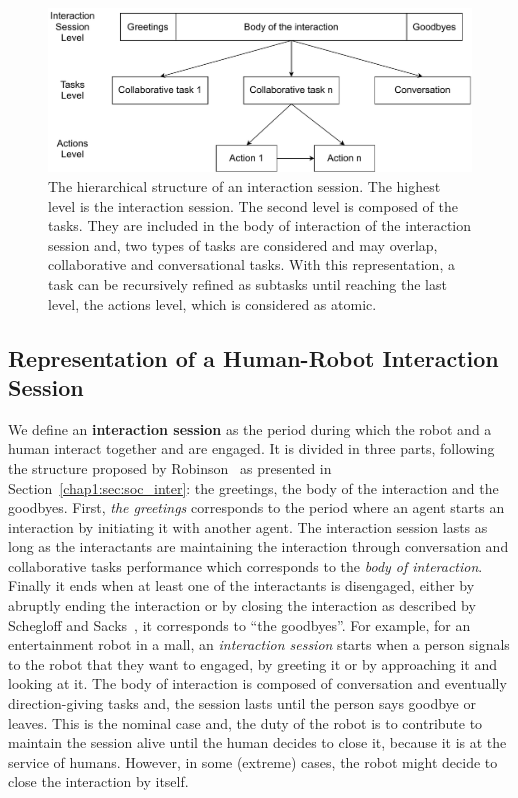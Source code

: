\documentclass[a4paper,11pt,twoside]{StyleThese}
\begin{document}
\begin{figure}[!ht]
	\centering
	\includegraphics[width=\linewidth]{figures/chapter2/session_interaction.pdf}
	\caption{The hierarchical structure of an interaction session. The highest level is the interaction session. The second level is composed of the tasks. They are included in the body of interaction of the interaction session and, two types of tasks are considered and may overlap, collaborative and conversational tasks. With this representation, a task can be recursively refined as subtasks until reaching the last level, the actions level, which is considered as atomic.
		}
	\label{fig:levels}
\end{figure}


\subsection{Representation of a Human-Robot Interaction Session}
We define an \textbf{interaction session} as the period during which the robot and a human interact together and are engaged. It is divided in three parts, following the structure proposed by Robinson~\cite{robinson_overall_2012} as presented in Section~\ref{chap1:sec:soc_inter}: the greetings, the body of the interaction and the goodbyes. First, \textit{the greetings} corresponds to the period where an agent starts an interaction by initiating it with another agent. The interaction session lasts as long as the interactants are maintaining the interaction through conversation and collaborative tasks performance which corresponds to the \textit{body of interaction}. Finally it ends when at least one of the interactants is disengaged, either by abruptly ending the interaction or by closing the interaction as described by Schegloff and Sacks~\cite{schegloff_1973_opening}, it corresponds to ``the goodbyes''. For example, for an entertainment robot in a mall, an \textit{interaction session} starts when a person signals to the robot that they want to engaged, by greeting it or by approaching it and looking at it. The body of interaction is composed of conversation and eventually direction-giving tasks and, the session lasts until the person says goodbye or leaves. This is the nominal case and, the duty of the robot is to contribute to maintain the session alive until the human decides to close it, because it is at the service of humans. However, in some (extreme) cases, the robot might decide to close the interaction by itself.
\end{document}
